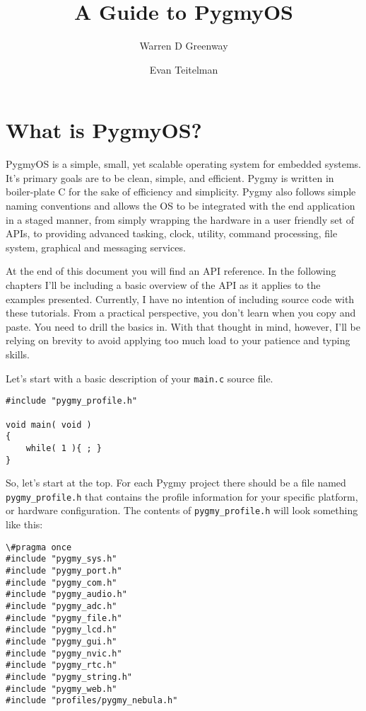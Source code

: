 \documentclass{article}
\begin{document}
\title{A Guide to PygmyOS}
\author{Warren D Greenway \and Evan Teitelman}
\maketitle

\section{What is PygmyOS?}
PygmyOS is a simple, small, yet scalable operating system for embedded systems. It's primary goals are to be clean, simple, and efficient. Pygmy is written in boiler-plate C for the sake of efficiency and simplicity. Pygmy also follows simple naming conventions and allows the OS to be integrated with the end application in a staged manner, from simply wrapping the hardware in a user friendly set of APIs, to providing advanced tasking, clock, utility, command processing, file system, graphical and messaging services.

At the end of this document you will find an API reference. In the following chapters I'll be including a basic overview of the API as it applies to the examples presented. Currently, I have no intention of including source code with these tutorials. From a practical perspective, you don't learn when you copy and paste. You need to drill the basics in. With that thought in mind, however, I'll be relying on brevity to avoid applying too much load to your patience and typing skills.

Let's start with a basic description of your \verb|main.c| source file.

\begin{lstlisting}
#include "pygmy_profile.h"

void main( void )
{
	while( 1 ){ ; }
}
\end{lstlisting}

So, let's start at the top. For each Pygmy project there should be a file named \verb|pygmy_profile.h| that contains the profile information for your specific platform, or hardware configuration. The contents of \verb|pygmy_profile.h| will look something like this:

\begin{lstlisting}
\#pragma once
#include "pygmy_sys.h"
#include "pygmy_port.h"
#include "pygmy_com.h"
#include "pygmy_audio.h"
#include "pygmy_adc.h"
#include "pygmy_file.h"
#include "pygmy_lcd.h"
#include "pygmy_gui.h"
#include "pygmy_nvic.h"
#include "pygmy_rtc.h"
#include "pygmy_string.h"
#include "pygmy_web.h"
#include "profiles/pygmy_nebula.h"
\end{lstlisting}
\end{document}
